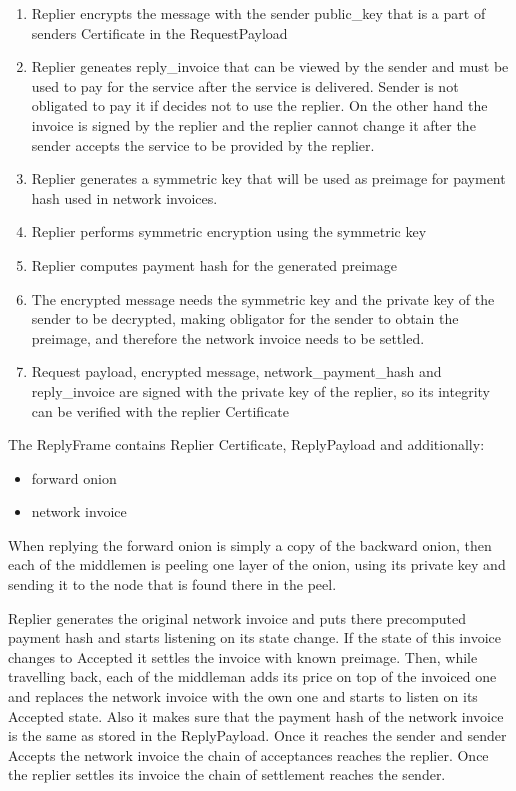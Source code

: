 \documentclass{article}
\begin{document}
\begin{enumerate}
	\item Replier encrypts the message with the sender public\_key that is a part of senders Certificate in the RequestPayload
	\item Replier geneates reply\_invoice that can be viewed by the sender and must be used to pay for the service after the service is delivered. Sender is not obligated to pay it if decides not to use the replier. On the other hand the invoice is signed by the replier and the replier cannot change it after the sender accepts the service to be provided by the replier.
	\item Replier generates a symmetric key that will be used as preimage for payment hash used in network invoices.
	\item Replier performs symmetric encryption using the symmetric key
	\item Replier computes payment hash for the generated preimage
	\item The encrypted message needs the symmetric key and the private key of the sender to be decrypted, making obligator for the sender to obtain the preimage, and therefore the network invoice needs to be settled.
	\item Request payload, encrypted message, network\_payment\_hash and reply\_invoice are signed with the private key of the replier, so its integrity can be verified with the replier Certificate
\end{enumerate}

The ReplyFrame contains Replier Certificate, ReplyPayload and additionally:

\begin{itemize}
	\item  forward onion
	\item  network invoice
\end{itemize}

When replying the forward onion is simply a copy of the backward onion, then each of the middlemen is peeling one layer of the onion, using its private key and sending it to the node that is found there in the peel.

Replier generates the original network invoice and puts there precomputed payment hash and starts listening on its state change. If the state of this invoice changes to Accepted it settles the invoice with known preimage.
Then, while travelling back, each of the middleman adds its price on top of the invoiced one and replaces the network invoice with the own one and starts to listen on its Accepted state. Also it makes sure that the payment hash of the network invoice is the same as stored in the ReplyPayload.
Once it reaches the sender and sender Accepts the network invoice the chain of acceptances reaches the replier. Once the replier settles its invoice the chain of settlement reaches the sender.
\end{document}
